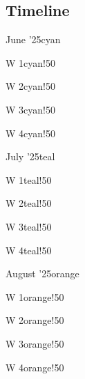 \documentclass{article}
\newcommand{\release}[2]{%
        #1
        \hspace*{\fill}
        \textcolor{gray}{#2}\par}
\theoremstyle{mytheoremstyle}
\theoremstyle{mytheoremstyle}
\theoremstyle{myproblemstyle}
\begin{document}
    \subsection*{Timeline}
      \begin{releaseyear}{June '25}{cyan}
        \begin{releasequarter}{W 1}{cyan!50}
          \release{}{}
        \end{releasequarter}
        \begin{releasequarter}{W 2}{cyan!50}
          \release{}{}
        \end{releasequarter}
        \begin{releasequarter}{W 3}{cyan!50}
          \release{}{}
        \end{releasequarter}
        \begin{releasequarter}{W 4}{cyan!50}
          \release{}{}
        \end{releasequarter}
      \end{releaseyear}
      \begin{releaseyear}{July '25}{teal}
        \begin{releasequarter}{W 1}{teal!50}
          \release{}{}
        \end{releasequarter}
        \begin{releasequarter}{W 2}{teal!50}
          \release{}{}
        \end{releasequarter}
        \begin{releasequarter}{W 3}{teal!50}
          \release{}{}
        \end{releasequarter}
        \begin{releasequarter}{W 4}{teal!50}
          \release{}{}
        \end{releasequarter}
      \end{releaseyear}
      \begin{releaseyear}{August '25}{orange}
        \begin{releasequarter}{W 1}{orange!50}
          \release{}{}
        \end{releasequarter}
        \begin{releasequarter}{W 2}{orange!50}
          \release{}{}
        \end{releasequarter}
        \begin{releasequarter}{W 3}{orange!50}
          \release{}{}
        \end{releasequarter}
        \begin{releasequarter}{W 4}{orange!50}
          \release{}{}
        \end{releasequarter}
      \end{releaseyear}
  
\end{document}

